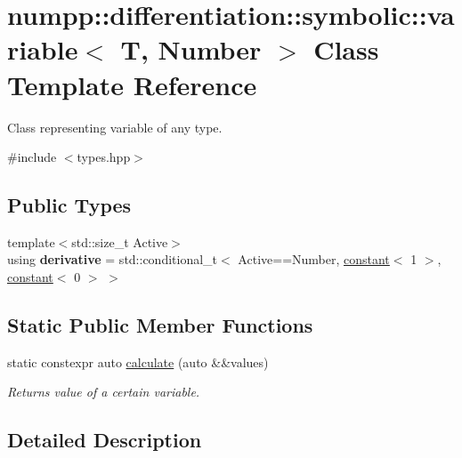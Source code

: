 \hypertarget{classnumpp_1_1differentiation_1_1symbolic_1_1variable}{}\section{numpp\+:\+:differentiation\+:\+:symbolic\+:\+:variable$<$ T, Number $>$ Class Template Reference}
\label{classnumpp_1_1differentiation_1_1symbolic_1_1variable}


Class representing variable of any type.  




{\ttfamily \#include $<$types.\+hpp$>$}

\subsection*{Public Types}
\begin{DoxyCompactItemize}
\item 
\mbox{\label{classnumpp_1_1differentiation_1_1symbolic_1_1variable_a982b8fd32deea706ecd44786a0a4b35a}} 
{\footnotesize template$<$std\+::size\+\_\+t Active$>$ }\\using {\bfseries derivative} = std\+::conditional\+\_\+t$<$ Active==Number, \hyperlink{classnumpp_1_1differentiation_1_1symbolic_1_1constant}{constant}$<$ 1 $>$, \hyperlink{classnumpp_1_1differentiation_1_1symbolic_1_1constant}{constant}$<$ 0 $>$ $>$
\end{DoxyCompactItemize}
\subsection*{Static Public Member Functions}
\begin{DoxyCompactItemize}
\item 
static constexpr auto \hyperlink{classnumpp_1_1differentiation_1_1symbolic_1_1variable_ad73b5d668d3bcf9802a0464ea3389ac6}{calculate} (auto \&\&values)
\begin{DoxyCompactList}\small\item\em Returns value of a certain variable. \end{DoxyCompactList}\end{DoxyCompactItemize}


\subsection{Detailed Description}
